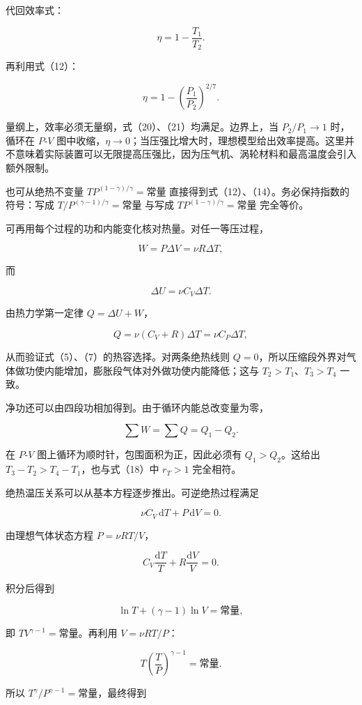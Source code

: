 \documentclass[12pt,a4paper,UTF8]{ctexart}
\begin{document}
代回效率式：

\[
\boxed{\eta=1-\frac{T_1}{T_2}}. \tag{20}
\]

再利用式（12）：

\[
\boxed{\eta=1-\left(\frac{P_1}{P_2}\right)^{2/7}}. \tag{21}
\]

量纲上，效率必须无量纲，式（20）、（21）均满足。边界上，当
\(P_2/P_1\to1\) 时，循环在 \(P\)-\(V\)
图中收缩，\(\eta\to0\)；当压强比增大时，理想模型给出效率提高。这里并不意味着实际装置可以无限提高压强比，因为压气机、涡轮材料和最高温度会引入额外限制。

也可从绝热不变量 \(TP^{(1-\gamma)/\gamma}=\text{常量}\)
直接得到式（12）、（14）。务必保持指数的符号：写成
\(T/P^{(\gamma-1)/\gamma}=\text{常量}\) 与写成
\(TP^{(1-\gamma)/\gamma}=\text{常量}\) 完全等价。

可再用每个过程的功和内能变化核对热量。对任一等压过程，

\[
W=P\Delta V=\nu R\Delta T,
\]

而

\[
\Delta U=\nu C_V\Delta T.
\]

由热力学第一定律 \(Q=\Delta U+W\)，

\[
Q=\nu(C_V+R)\Delta T=\nu C_P\Delta T,
\]

从而验证式（5）、（7）的热容选择。对两条绝热线则
\(Q=0\)，所以压缩段外界对气体做功使内能增加，膨胀段气体对外做功使内能降低；这与
\(T_2>T_1\)、\(T_3>T_4\) 一致。

净功还可以由四段功相加得到。由于循环内能总改变量为零，

\[
\sum W=\sum Q=Q_1-Q_2.
\]

在 \(P\)-\(V\) 图上循环为顺时针，包围面积为正，因此必须有
\(Q_1>Q_2\)。这给出 \(T_3-T_2>T_4-T_1\)，也与式（18）中 \(r_T>1\)
完全相符。

绝热温压关系可以从基本方程逐步推出。可逆绝热过程满足

\[
\nu C_V\,\mathrm dT+P\,\mathrm dV=0.
\]

由理想气体状态方程 \(P=\nu RT/V\)，

\[
C_V\frac{\mathrm dT}{T}+R\frac{\mathrm dV}{V}=0.
\]

积分后得到

\[
\ln T+(\gamma-1)\ln V=\text{常量},
\]

即 \(TV^{\gamma-1}=\text{常量}\)。再利用 \(V=\nu RT/P\)：

\[
T\left(\frac{T}{P}\right)^{\gamma-1}=\text{常量}.
\]

所以 \(T^\gamma/P^{\gamma-1}=\text{常量}\)，最终得到
\end{document}
